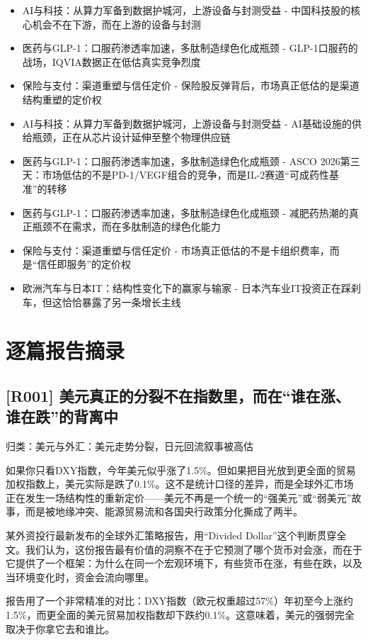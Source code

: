\documentclass[11pt]{ctexart}
\begin{document}
\begin{itemize}
  \item [R016] AI与科技：从算力军备到数据护城河，上游设备与封测受益 - 中国科技股的核心机会不在下游，而在上游的设备与封测
  \item [R017] 医药与GLP-1：口服药渗透率加速，多肽制造绿色化成瓶颈 - GLP-1口服药的战场，IQVIA数据正在低估真实竞争烈度
  \item [R018] 保险与支付：渠道重塑与信任定价 - 保险股反弹背后，市场真正低估的是渠道结构重塑的定价权
  \item [R019] AI与科技：从算力军备到数据护城河，上游设备与封测受益 - AI基础设施的供给瓶颈，正在从芯片设计延伸至整个物理供应链
  \item [R020] 医药与GLP-1：口服药渗透率加速，多肽制造绿色化成瓶颈 - ASCO 2026第三天：市场低估的不是PD-1/VEGF组合的竞争，而是IL-2赛道“可成药性基准”的转移
  \item [R021] 医药与GLP-1：口服药渗透率加速，多肽制造绿色化成瓶颈 - 减肥药热潮的真正瓶颈不在需求，而在多肽制造的绿色化能力
  \item [R022] 保险与支付：渠道重塑与信任定价 - 市场真正低估的不是卡组织费率，而是“信任即服务”的定价权
  \item [R023] 欧洲汽车与日本IT：结构性变化下的赢家与输家 - 日本汽车业IT投资正在踩刹车，但这恰恰暴露了另一条增长主线
\end{itemize}
\section{逐篇报告摘录}
\subsection{[R001] 美元真正的分裂不在指数里，而在“谁在涨、谁在跌”的背离中}
{\small\color{refgray}归类：美元与外汇：美元走势分裂，日元回流叙事被高估}

如果你只看DXY指数，今年美元似乎涨了1.5\%。但如果把目光放到更全面的贸易加权指数上，美元实际是跌了0.1\%。这不是统计口径的差异，而是全球外汇市场正在发生一场结构性的重新定价——美元不再是一个统一的“强美元”或“弱美元”故事，而是被地缘冲突、能源贸易流和各国央行政策分化撕成了两半。

某外资投行最新发布的全球外汇策略报告，用“Divided Dollar”这个判断贯穿全文。我们认为，这份报告最有价值的洞察不在于它预测了哪个货币对会涨，而在于它提供了一个框架：为什么在同一个宏观环境下，有些货币在涨，有些在跌，以及当环境变化时，资金会流向哪里。

报告用了一个非常精准的对比：DXY指数（欧元权重超过57\%）年初至今上涨约1.5\%，而更全面的美元贸易加权指数却下跌约0.1\%。这意味着，美元的强弱完全取决于你拿它去和谁比。
\end{document}
